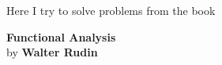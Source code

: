 \newcommand{\hull}{\mathop{\rm hull}\nolimits}
\newcommand{\id}{\mathop{\rm id}\nolimits}
\newcommand{\Int}{\mathop{\rm Int}\nolimits}
\newcommand{\inter}[1]{\ensuremath{#1^{\circ}}}
\def\Lip{\mathop{\rm Lip}\nolimits}
\def\lip{\mathop{\rm lip}\nolimits}
\def\Ker{\mathop{\rm Ker}\nolimits}
\def\ker{\mathop{\rm ker}\nolimits}
\def\Re{\mathop{\rm Re}\nolimits}
\def\Im{\mathop{\rm Im}\nolimits}
\def\supp{\mathop{\rm supp}\nolimits}


\newenvironment{excopy}
{\item\begin{minipage}[t]{.8\textwidth}\footnotesize}
{\smallskip\hrule\end{minipage}}



\maketitle
\newpage
\tableofcontents
\newpage


\maketitle

\setcounter{chapter}{-1}

Here I try to solve problems
from the book \cite{RudinFA79}
\begin{center}
\textbf{Functional Analysis}\\
by
\textbf{Walter Rudin}
\end{center}



